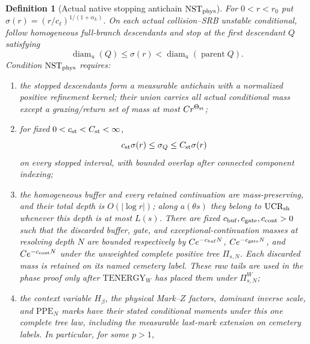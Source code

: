 \documentclass[11pt]{article}
\newtheorem{definition}[theorem]{Definition}
\begin{document}
\begin{definition}[Actual native stopping antichain
$\mathrm{NST}_{\rm phys}$]
\label{def:actual-native-stopping}
For $0<r<r_0$ put
\(
 \sigma(r)=(r/c_\ell)^{1/(1+\alpha_L)}.
\)
On each actual collision--SRB unstable conditional, follow homogeneous
full-branch descendants and stop at the first descendant $Q$ satisfying
\begin{equation}
\label{eq:native-first-stopping-rule}
 \operatorname{diam}_u(Q)\le\sigma(r)
 <\operatorname{diam}_u(\operatorname{parent}Q).
\end{equation}
Condition $\mathrm{NST}_{\rm phys}$ requires:
\begin{enumerate}[label=\textup{(NST\arabic*)}]
\item the stopped descendants form a measurable antichain with a normalized
      positive refinement kernel; their union carries all actual conditional
      mass except a grazing/return set of mass at most $Cr^{\Theta_{\rm st}}$;
\item for fixed $0<c_{\rm st}<C_{\rm st}<\infty$,
      \begin{equation}
      \label{eq:native-stopping-comparability}
       c_{\rm st}\sigma(r)\le\sigma_Q
       \le C_{\rm st}\sigma(r)
      \end{equation}
      on every stopped interval, with bounded overlap after connected
      component indexing;
\item the homogeneous buffer and every retained continuation are
      mass-preserving, and their total depth is $O(|\log r|)$; along
      $a(\theta s)$ they belong to $\mathrm{UCR}_{\rm sh}$ whenever this
      depth is at most $L(s)$.  There are fixed
      $c_{\rm buf},c_{\rm gate},c_{\rm cont}>0$ such that the discarded
      buffer, gate, and exceptional-continuation masses at resolving depth
      $N$ are bounded respectively by
      $Ce^{-c_{\rm buf}N}$, $Ce^{-c_{\rm gate}N}$, and
      $Ce^{-c_{\rm cont}N}$ under the unweighted complete positive tree
      $\Pi_{s,N}$.  Each discarded mass is retained on its named cemetery
      label.  These raw tails are used in the phase proof only after
      $\mathrm{TENERGY}_{W}$ has placed them under $\Pi_{s,N}^{W}$;
\item the context variable $H_\beta$, the physical Mark--$Z$ factors,
      dominant inverse scale, and $\mathrm{PPE}_{N}$ marks have their stated
      conditional moments under this one complete tree law, including the
      measurable last-mark extension on cemetery labels.  In
      particular, for some $p>1$,

\end{enumerate}
\end{definition}
\end{document}
